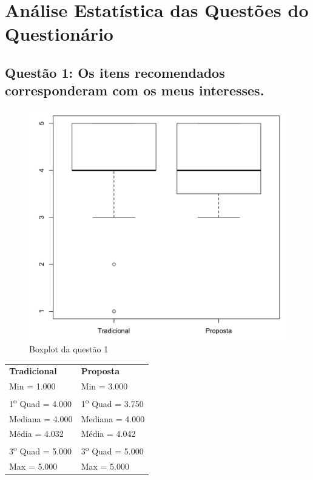 \chapter{Análise Estatística das Questões do Questionário}\label{ape:analise-estatistica-questionario}

\section{Questão 1: Os itens recomendados corresponderam com os meus interesses.}

\begin{figure}[htb]
  \caption{\label{fig:questao1-boxplot}Boxplot da questão 1}
  \begin{center}
      \includegraphics[scale=0.4]{./Figuras/questao1-boxplot.png}
  \end{center}
\end{figure}

\begin{table}[h]
\begin{tabular}{p{}p{}}
\textbf{Tradicional} & \textbf{Proposta} \\
Min = 1.000 & Min = 3.000\\
1\textsuperscript{o} Quad = 4.000 & 1\textsuperscript{o} Quad = 3.750\\
Mediana = 4.000 & Mediana = 4.000\\
Média = 4.032 & Média = 4.042\\
3\textsuperscript{o} Quad = 5.000 & 3\textsuperscript{o} Quad = 5.000\\
Max = 5.000 & Max = 5.000\\
\end{tabular}
\end{table}

